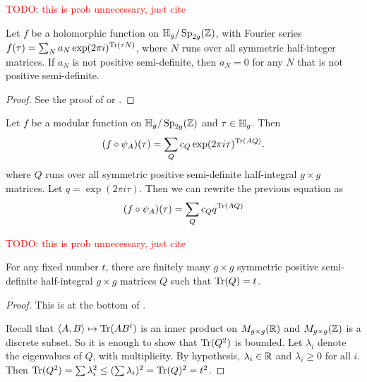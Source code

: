 \documentclass{amsart}
\begin{document}
\textcolor{red}{TODO: this is prob unnecessary, just cite}

\begin{theorem}
  Let $f$ be a holomorphic function on $\mathbb{H}_g/\operatorname{Sp}_{2g}(\mathbb{Z})$, with Fourier series $f(\tau) = \sum_N a_N \exp(2 \pi i)^{\operatorname{Tr}(\tau N)}$, where $N$ runs over all symmetric half-integer matrices. If $a_N$ is not positive semi-definite, then $a_N = 0$ for any $N$ that is not positive semi-definite.
\end{theorem}
\begin{proof}
  See the proof of \cite[Thm.~1, Pg.~45]{klingen1990introductory} or \cite[Thm.~2, Pg.~191]{bruinier2008the123}.

\end{proof}

Let $f$ be a modular function on $\mathbb{H}_g/\operatorname{Sp}_{2g}(\mathbb{Z})$ and $\tau \in \mathbb{H}_g$. Then
\[
  (f \circ \psi_A)(\tau) = \sum_Q c_Q \exp(2 \pi i \tau)^{\operatorname{Tr}(AQ)}.
\]
where $Q$ runs over all symmetric positive semi-definite half-integral $g \times g$ matrices.
Let $q = \exp(2 \pi i \tau)$. Then we can rewrite the previous equation as
\[
  (f \circ \psi_A)(\tau) = \sum_Q c_Q q^{\operatorname{Tr}(AQ)}
\]

\textcolor{red}{TODO: this is prob unnecessary, just cite}

\begin{lemma}\label{lem:finite-fixed-trace}
  For any fixed number $t$, there are finitely many $g \times g$ symmetric positive semi-definite half-integral $g \times g$ matrices $Q$ such that $\operatorname{Tr}(Q) = t$.
\end{lemma}
\begin{proof}
  This is at the bottom of \cite[Pg.~46]{klingen1990introductory}.

  Recall that $\langle A,B \rangle \mapsto \operatorname{Tr}(AB^t)$ is an inner product on $M_{g \times g}(\mathbb{R})$ and $M_{g \times g}(\mathbb{Z})$ is a discrete subset. So it is enough to show that $\operatorname{Tr}(Q^2)$ is bounded. Let $\lambda_i$ denote the eigenvalues of $Q$, with multiplicity. By hypothesis, $\lambda_i \in \mathbb{R}$ and $\lambda_i \geq 0$ for all $i$. Then $\operatorname{Tr}(Q^2) = \sum \lambda_i^2 \leq (\sum \lambda_i)^2 = \operatorname{Tr}(Q)^2 = t^2$.
\end{proof}
\end{document}
